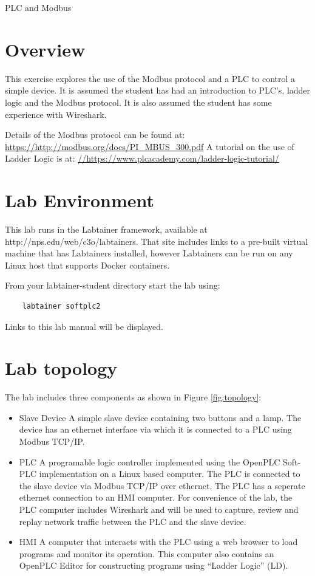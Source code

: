 


\begin{center}
{\LARGE PLC and Modbus}
\vspace{0.1in}\\
\end{center}


\section{Overview}
This exercise explores the use of the Modbus protocol and a
PLC to control a simple device.
It is assumed the student has had an introduction to PLC's, ladder logic and 
the Modbus protocol.  It is also assumed the student has some experience with
Wireshark.

Details of the Modbus protocol can be found at:
\url {https://http://modbus.org/docs/PI\_MBUS\_300.pdf}
A tutorial on the use of Ladder Logic is at:
\url {//https://www.plcacademy.com/ladder-logic-tutorial/}


\section{Lab Environment}
This lab runs in the Labtainer framework,
available at http://nps.edu/web/c3o/labtainers.
That site includes links to a pre-built virtual machine
that has Labtainers installed, however Labtainers can
be run on any Linux host that supports Docker containers.

From your labtainer-student directory start the lab using:
\begin{verbatim}
    labtainer softplc2
\end{verbatim}
Links to this lab manual will be displayed.  

\section{Lab topology}
The lab includes three components as shown in Figure \ref{fig:topology}:
\begin{itemize}
\item{Slave Device} A simple slave device containing two buttons and a lamp.  The device has an
ethernet interface via which it is connected to a PLC using Modbus TCP/IP.
\item{PLC} A programable logic controller implemented using the OpenPLC Soft-PLC implementation
on a Linux based computer.  The PLC is connected to the slave device via Modbus TCP/IP over ethernet.
The PLC has a seperate ethernet connection to an HMI computer.
For convenience of the lab, the PLC computer includes Wireshark and will be used to capture, review and
replay network traffic between the PLC and the slave device.  

\item{HMI} A computer that interacts with the PLC using a web browser to load programs and monitor its operation.  This
computer also contains an OpenPLC Editor for constructing programs using ``Ladder Logic'' (LD).
\end{itemize}


